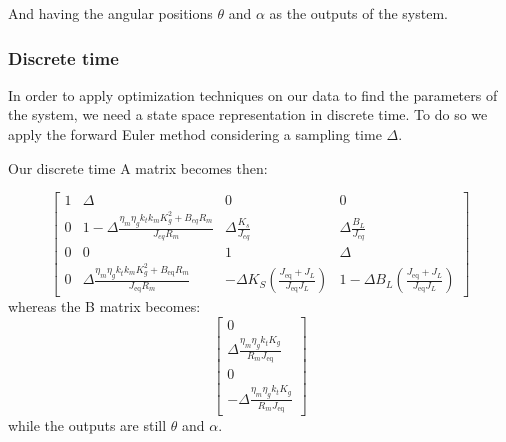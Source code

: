                 And having the angular positions $\theta$ and $\alpha$ as the outputs of the system.

            \subsubsection{Discrete time}

                In order to apply optimization techniques on our data to find the parameters of the system, we need a state space representation in discrete time. To do so we apply the forward Euler method considering a sampling time $\Delta$.

                Our discrete time A matrix becomes then:

                \begin{equation*}
                    \left\lbrack \begin{array}{cccc}
                        1 & \Delta  & 0 & 0\\
                        0 & 1-\Delta \frac{\eta_m \eta_g k_t k_m K_g^2 +B_{eq}R_m}{J_{eq}R_m} & \Delta \frac{K_s}{J_{eq}} & \Delta\frac{B_L}{J_{eq}}\\
                        0 & 0 & 1 & \Delta \\
                        0 & \Delta \frac{\eta_m \eta_g k_t k_m K_g^2 +B_{\mathrm{eq}} R_m }{J_{\mathrm{eq}} R_m } & -{\Delta K}_S \left(\frac{J_{\mathrm{eq}} +J_{L} }{J_{\mathrm{eq}} J_{L} }\right) & 1-{\Delta B}_L \left(\frac{J_{\mathrm{eq}} +J_{L} }{J_{\mathrm{eq}} J_{L} }\right)
                    \end{array}\right\rbrack 
                    \label{mat:discrete_system}
                \end{equation*}
                whereas the B matrix becomes:       
                \begin{equation*}
                    \left\lbrack\begin{array}{c}
                        0\\
                        \Delta \frac{\eta_m \eta_g k_t K_g }{R_m J_{\mathrm{eq}} }\\
                        0\\
                        -\Delta \frac{\eta_m \eta_g k_t K_g }{R_m J_{\mathrm{eq}} }
                    \end{array}\right\rbrack
                \end{equation*}
                while the outputs are still $\theta$ and $\alpha$.

